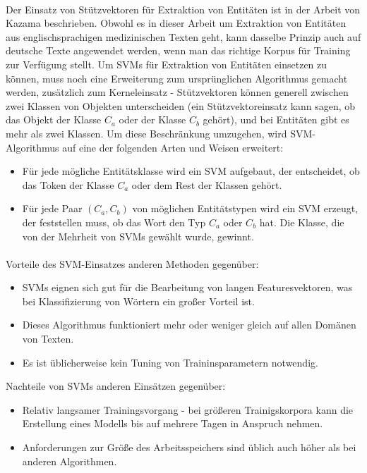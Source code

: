\paragraph{}
Der Einsatz von Stützvektoren für Extraktion von Entitäten ist in der Arbeit von Kazama\cite{kazama2002tuning} beschrieben. Obwohl es in dieser Arbeit um Extraktion von Entitäten aus englischsprachigen medizinischen Texten geht, kann dasselbe Prinzip auch auf deutsche Texte angewendet werden, wenn man das richtige Korpus für Training zur Verfügung stellt. Um SVMs für Extraktion von Entitäten einsetzen zu können, muss noch eine Erweiterung zum ursprünglichen Algorithmus gemacht werden, zusätzlich zum Kerneleinsatz - Stützvektoren können generell zwischen zwei Klassen von Objekten unterscheiden (ein Stützvektoreinsatz kann sagen, ob das Objekt der Klasse $C_a$ oder der Klasse $C_b$ gehört), und bei Entitäten gibt es mehr als zwei Klassen. Um diese Beschränkung umzugehen, wird SVM-Algorithmus auf eine der folgenden Arten und Weisen erweitert:

\begin{itemize}
\item Für jede mögliche Entitätsklasse wird ein SVM aufgebaut, der entscheidet, ob das Token der Klasse $C_a$ oder dem Rest der Klassen gehört.
\item Für jede Paar $(C_a, C_b)$ von möglichen Entitätstypen wird ein SVM erzeugt, der feststellen muss, ob das Wort den Typ $C_a$ oder $C_b$ hat. Die Klasse, die von der Mehrheit von SVMs gewählt wurde, gewinnt.
\end{itemize}

\paragraph{}
Vorteile des SVM-Einsatzes anderen Methoden gegenüber\cite{joachims1998text}:
\begin{itemize}
\item SVMs eignen sich gut für die Bearbeitung von langen Featuresvektoren, was bei Klassifizierung von Wörtern ein großer Vorteil ist.
\item Dieses Algorithmus funktioniert mehr oder weniger gleich auf allen Domänen von Texten.
\item Es ist üblicherweise kein Tuning von Traininsparametern notwendig.
\end{itemize}

Nachteile von SVMs anderen Einsätzen gegenüber:
\begin{itemize}
\item Relativ langsamer Trainingsvorgang - bei größeren Trainigskorpora kann die Erstellung eines Modells bis auf mehrere Tagen in Anspruch nehmen.
\item Anforderungen zur Größe des Arbeitsspeichers sind üblich auch höher als bei anderen Algorithmen.
\end{itemize}

